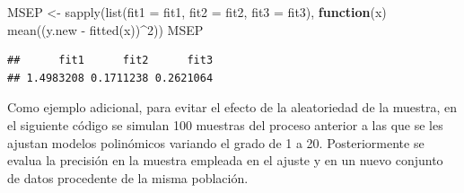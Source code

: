 \documentclass[
  spanish,
]{book}
\newenvironment{Shaded}{\begin{snugshade}}{\end{snugshade}}
\newcommand{\AttributeTok}[1]{\textcolor[rgb]{0.77,0.63,0.00}{#1}}
\newcommand{\ControlFlowTok}[1]{\textcolor[rgb]{0.13,0.29,0.53}{\textbf{#1}}}
\newcommand{\DecValTok}[1]{\textcolor[rgb]{0.00,0.00,0.81}{#1}}
\newcommand{\FunctionTok}[1]{\textcolor[rgb]{0.00,0.00,0.00}{#1}}
\newcommand{\NormalTok}[1]{#1}
\newcommand{\OtherTok}[1]{\textcolor[rgb]{0.56,0.35,0.01}{#1}}
\newcommand{\SpecialCharTok}[1]{\textcolor[rgb]{0.00,0.00,0.00}{#1}}
\theoremstyle{break}
\theoremstyle{definition}
\theoremstyle{definition}
\theoremstyle{definition}
\theoremstyle{definition}
\theoremstyle{remark}
\begin{document}
\begin{Shaded}
\begin{Highlighting}[]
\NormalTok{MSEP }\OtherTok{\textless{}{-}} \FunctionTok{sapply}\NormalTok{(}\FunctionTok{list}\NormalTok{(}\AttributeTok{fit1 =}\NormalTok{ fit1, }\AttributeTok{fit2 =}\NormalTok{ fit2, }\AttributeTok{fit3 =}\NormalTok{ fit3), }
               \ControlFlowTok{function}\NormalTok{(x) }\FunctionTok{mean}\NormalTok{((y.new }\SpecialCharTok{{-}} \FunctionTok{fitted}\NormalTok{(x))}\SpecialCharTok{\^{}}\DecValTok{2}\NormalTok{))}
\NormalTok{MSEP}
\end{Highlighting}
\end{Shaded}

\begin{verbatim}
##      fit1      fit2      fit3 
## 1.4983208 0.1711238 0.2621064
\end{verbatim}

Como ejemplo adicional, para evitar el efecto de la aleatoriedad de la muestra, en el siguiente código se simulan 100 muestras del proceso anterior a las que se les ajustan modelos polinómicos variando el grado de 1 a 20. Posteriormente se evalua la precisión en la muestra empleada en el ajuste y en un nuevo conjunto de datos procedente de la misma población.
\end{document}
